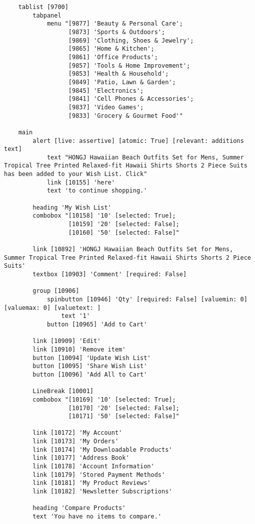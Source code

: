\begin{tcolorbox}[breakable]
\begin{lstlisting}
    tablist [9700]
        tabpanel
            menu "[9877] 'Beauty & Personal Care'; 
                  [9873] 'Sports & Outdoors'; 
                  [9869] 'Clothing, Shoes & Jewelry'; 
                  [9865] 'Home & Kitchen'; 
                  [9861] 'Office Products'; 
                  [9857] 'Tools & Home Improvement'; 
                  [9853] 'Health & Household'; 
                  [9849] 'Patio, Lawn & Garden'; 
                  [9845] 'Electronics'; 
                  [9841] 'Cell Phones & Accessories'; 
                  [9837] 'Video Games'; 
                  [9833] 'Grocery & Gourmet Food'"

    main
        alert [live: assertive] [atomic: True] [relevant: additions text]
            text "HONGJ Hawaiian Beach Outfits Set for Mens, Summer Tropical Tree Printed Relaxed-fit Hawaii Shirts Shorts 2 Piece Suits has been added to your Wish List. Click"
            link [10155] 'here'
            text 'to continue shopping.'

        heading 'My Wish List'
        combobox "[10158] '10' [selected: True]; 
                  [10159] '20' [selected: False]; 
                  [10160] '50' [selected: False]"

        link [10892] 'HONGJ Hawaiian Beach Outfits Set for Mens, Summer Tropical Tree Printed Relaxed-fit Hawaii Shirts Shorts 2 Piece Suits'
        textbox [10903] 'Comment' [required: False]

        group [10906]
            spinbutton [10946] 'Qty' [required: False] [valuemin: 0] [valuemax: 0] [valuetext: ] 
                text '1'
            button [10965] 'Add to Cart'

        link [10909] 'Edit'
        link [10910] 'Remove item'
        button [10094] 'Update Wish List'
        button [10095] 'Share Wish List'
        button [10096] 'Add All to Cart'

        LineBreak [10001]
        combobox "[10169] '10' [selected: True]; 
                  [10170] '20' [selected: False]; 
                  [10171] '50' [selected: False]"

        link [10172] 'My Account'
        link [10173] 'My Orders'
        link [10174] 'My Downloadable Products'
        link [10177] 'Address Book'
        link [10178] 'Account Information'
        link [10179] 'Stored Payment Methods'
        link [10181] 'My Product Reviews'
        link [10182] 'Newsletter Subscriptions'

        heading 'Compare Products'
        text 'You have no items to compare.'


\end{lstlisting}
\end{tcolorbox}
